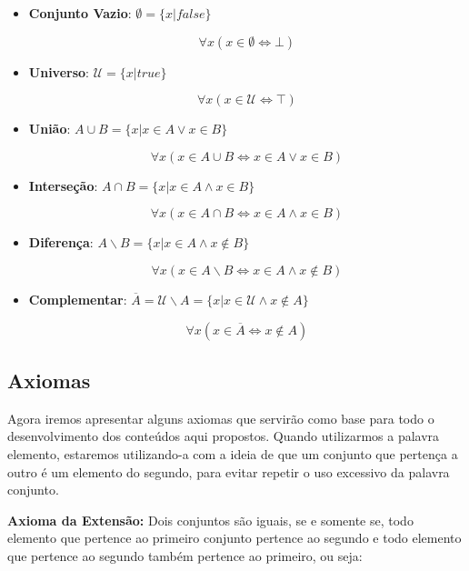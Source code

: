\begin{itemize}
\item \textbf{Conjunto Vazio}: $\emptyset = \{x | false\}$

\[\forall x (x \in \emptyset \iff \bot)\]

\qquad

\item \textbf{Universo}: $\mathcal{U} = \{x | true \}$

\[\forall x (x \in \mathcal{U} \iff \top)\]

\qquad

\item \textbf{União}: $A \cup B = \{x | x \in A \vee x \in B\}$

\[\forall x (x \in A \cup B \iff x \in A \vee x \in B)\]

\qquad

\item \textbf{Interseção}: $A \cap B = \{x | x \in A \wedge x \in B\}$

\[\forall x (x \in A \cap B \iff x \in A \wedge x \in B)\]

\qquad

\item \textbf{Diferença}: $A \backslash B = \{x | x \in A \wedge x \notin B\}$

\[\forall x (x \in A \backslash B \iff x \in A \wedge x \notin B)\]

\qquad

\item \textbf{Complementar}: $\overline A = \mathcal{U} \backslash A = \{x | x \in \mathcal{U} \land x \notin A\}$

\[\forall x (x \in \overline A \iff x \notin A)\]
\end{itemize} 

\subsection{Axiomas}
Agora iremos apresentar alguns axiomas que servirão como base para todo o desenvolvimento dos conteúdos aqui propostos. Quando utilizarmos a palavra elemento, estaremos utilizando-a com a ideia de que um conjunto que pertença a outro é um elemento do segundo, para evitar repetir o uso excessivo da palavra conjunto.

\textbf{Axioma da Extensão:} Dois conjuntos são iguais, se e somente se, todo elemento que pertence ao primeiro conjunto pertence ao segundo e todo elemento que pertence ao segundo também pertence ao primeiro, ou seja:

